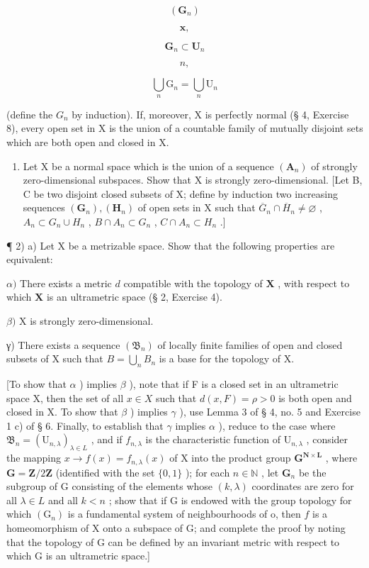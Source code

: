 \[
\left(\mathbf {G} _ {n}\right)
\]

\[
\mathbf {x},
\]

\[
\mathbf {G} _ {n} \subset \mathbf {U} _ {n}
\]

\[
n,
\]

\[
\bigcup_ {n} \mathrm{G} _ {n} = \bigcup_ {n} \mathrm{U} _ {n}
\]

(define the \(G_{n}\) by induction). If, moreover, X is perfectly normal (§ 4, Exercise 8), every open set in X is the union of a countable family of mutually disjoint sets which are both open and closed in X.

\begin{enumerate}
\def\labelenumi{\alph{enumi})}
\setcounter{enumi}{3}
\tightlist
\item
  Let X be a normal space which is the union of a sequence \((\mathbf{A}_{n})\) of strongly zero-dimensional subspaces. Show that X is strongly zero-dimensional. {[}Let B, C be two disjoint closed subsets of X; define by induction two increasing sequences \((\mathbf{G}_{n}), (\mathbf{H}_{n})\) of open sets in X such that \(\overline{G}_{n} \cap \overline{H}_{n} \neq \varnothing\) , \(A_{n} \subset G_{n} \cup H_{n}\) , \(B \cap A_{n} \subset G_{n}\) , \(C \cap A_{n} \subset H_{n}\) .{]}
\end{enumerate}

¶ 2) a) Let X be a metrizable space. Show that the following properties are equivalent:

\(\alpha)\) There exists a metric \(d\) compatible with the topology of \(\mathbf{X}\) , with respect to which \(\mathbf{X}\) is an ultrametric space (§ 2, Exercise 4).

\(\beta)\) X is strongly zero-dimensional.

γ) There exists a sequence \((\mathfrak{B}_{n})\) of locally finite families of open and closed subsets of X such that \(B = \bigcup_{n} B_{n}\) is a base for the topology of X.

{[}To show that \(\alpha\) ) implies \(\beta\) ), note that if F is a closed set in an ultrametric space X, then the set of all \(x \in X\) such that \(d(x, F) = \rho > 0\) is both open and closed in X. To show that \(\beta\) ) implies \(\gamma\) ), use Lemma 3 of § 4, no. 5 and Exercise 1 c) of § 6. Finally, to establish that \(\gamma\) implies \(\alpha\) ), reduce to the case where \(\mathfrak{B}_n = (\mathrm{U}_{n,\lambda})_{\lambda \in L}\) , and if \(f_{n,\lambda}\) is the characteristic function of \(\mathrm{U}_{n,\lambda}\) , consider the mapping \(x \to f(x) = f_{n,\lambda}(x)\) of X into the product group \(\mathbf{G}^{\mathbf{N} \times \mathbf{L}}\) , where \(\mathbf{G} = \mathbf{Z}/2\mathbf{Z}\) (identified with the set \(\{0, 1\}\) ); for each \(n \in \mathbb{N}\) , let \(\mathbf{G}_n\) be the subgroup of G consisting of the elements whose \((k, \lambda)\) coordinates are zero for all \(\lambda \in L\) and all \(k < n\) ; show that if G is endowed with the group topology for which \((\mathrm{G}_n)\) is a fundamental system of neighbourhoods of o, then \(f\) is a homeomorphism of X onto a subspace of G; and complete the proof by noting that the topology of G can be defined by an invariant metric with respect to which G is an ultrametric space.{]}

